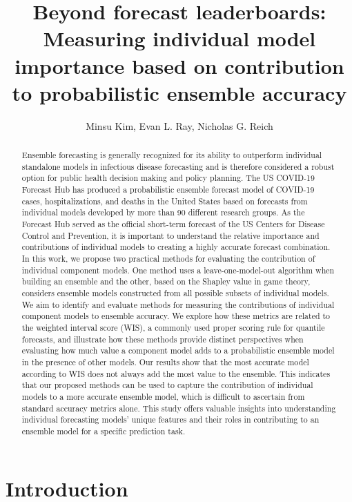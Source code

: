 \documentclass{article}
\title{Beyond forecast leaderboards: Measuring individual model importance based on contribution to probabilistic ensemble accuracy}
\author{Minsu Kim, Evan L. Ray, Nicholas G. Reich}
\date{}
\theoremstyle{definition}
\begin{document}

\maketitle



\begin{abstract}
Ensemble forecasting is generally recognized for its ability to outperform individual standalone models in infectious disease forecasting and is therefore considered a robust option for public health decision making and policy planning. The US COVID-19 Forecast Hub has produced a probabilistic ensemble forecast model of COVID-19 cases, hospitalizations, and deaths in the United States based on forecasts from individual models developed by more than 90 different research groups. As the Forecast Hub served as the official short-term forecast of the US Centers for Disease Control and Prevention, it is important to understand the relative importance and contributions of individual models to creating a highly accurate forecast combination. 
In this work, we propose two practical methods for evaluating the contribution of individual component models. 
One method uses a leave-one-model-out algorithm when building an ensemble and the other, based on the Shapley value in game theory, considers ensemble models constructed from all possible subsets of individual models. 
We aim to identify and evaluate methods for measuring the contributions of individual component models to ensemble accuracy. We explore how these metrics are related to the weighted interval score (WIS), a commonly used proper scoring rule for quantile forecasts, and illustrate how these methods provide distinct perspectives when evaluating how much value a component model adds to a probabilistic ensemble model in the presence of other models. Our results show that the most accurate model according to WIS does not always add the most value to the ensemble. This indicates that our proposed methods can be used to capture the contribution of individual models to a more accurate ensemble model, which is difficult to ascertain from standard accuracy metrics alone. This study offers valuable insights into understanding individual forecasting models’ unique features and their roles in contributing to an ensemble model for a specific prediction task.
    
\end{abstract}

\section{Introduction}
\end{document}
